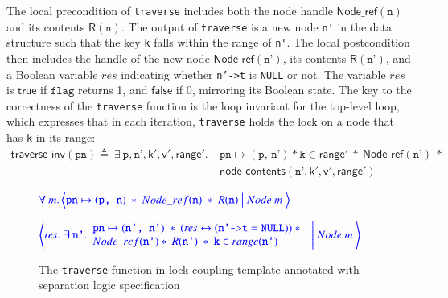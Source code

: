 \documentclass[a4paper,UKenglish,cleveref, autoref, thm-restate]{lipics-v2021}
\newcommand{\treerep}{\ensuremath{\mathsf{Node}}}
\newcommand{\nodeboxrep}{\ensuremath{\mathsf{Node\_ref}}}
\begin{document}
The local precondition of \lstinline{traverse} includes both the node handle $\nodeboxrep(\texttt{n})$ and its contents $\mathsf{R}(\texttt{n})$. The output of \lstinline{traverse} is a new node \lstinline{n'} in the data structure such that the key \texttt{k} falls within the range of \lstinline{n'}. The local postcondition then includes the handle of the new node $\nodeboxrep(\texttt{n'})$, its contents $\mathsf{R}(\texttt{n'})$, and a Boolean variable $\mathit{res}$ indicating whether \texttt{n'->t} is \texttt{NULL} or not. The variable $\mathit{res}$ is $\mathsf{true}$ if $\texttt{flag}$ returns 1, and $\mathsf{false}$ if 0, mirroring its Boolean state. The key to the correctness of the \texttt{traverse} function is the loop invariant for the top-level loop, which expresses that in each iteration, \lstinline{traverse} holds the lock on a node that has \lstinline{k} in its range:
\begin{align*}\mathsf{traverse\_inv}(\texttt{pn}) \triangleq\ \exists \ \texttt{p}, \texttt{n'}, \mathsf{k'}, \mathsf{v'}, \mathsf{range'}.\ &\texttt{pn} \mapsto (\texttt{p, n'}) \ast \texttt{k} \in \mathsf{range'}\ \ast \  \nodeboxrep(\texttt{n'})  \ \ast \\  &\mathsf{node\_contents}(\texttt{n'}, \mathsf{k'}, \mathsf{v'}, \mathsf{range'})
\end{align*}

\begin{figure}[!ht]
	$\color{blue}
	\forall \  m. \left\langle \texttt{pn} \mapsto (\texttt{p, n}) \ \ast \ 
	\nodeboxrep(\texttt{n})  \ \ast \ \mathsf{R}(\texttt{n}) \ \big| \ \treerep\ m \
	\right\rangle$
		
	$\color{blue}
	\left\langle \mathit{res}. \ \exists \  \texttt{n'}.
	\begin{array}{l} \texttt{pn} \mapsto (\texttt{n', n'}) \ \ast 
		\ (\mathit{res} \leftrightarrow (\texttt{n'->t} = \texttt{NULL}))  \ \ast \ \\ \nodeboxrep(\texttt{n'}) \ast \ \mathsf{R}(\texttt{n'})\ \ast \ \texttt{k} \in \mathsf{range}(\texttt{n'})
	\end{array}
	\ \Bigg| \ \treerep\ m \
	\right\rangle$
	\caption{The \texttt{traverse} function in lock-coupling template annotated with separation logic specification}
	\label{proof_lock_traverse}
\end{figure}
\end{document}
